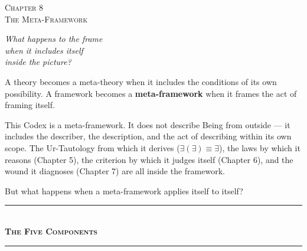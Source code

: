 \documentclass[10pt, openany, oneside]{book}
\renewcommand{\normalsize}{\fontsize{10}{13}\selectfont}
\renewcommand{\large}{\fontsize{11.5}{14}\selectfont}
\renewcommand{\huge}{\fontsize{17}{21}\selectfont}
\begin{document}
%
%
%

\newpage

\begin{center}
    {\huge\scshape Chapter 8}\\[0.3em]
    {\large\scshape The Meta-Framework}
\end{center}

\vspace{1.5em}

\begin{center}
    \itshape
    What happens to the frame\\
    when it includes itself\\
    inside the picture?
\end{center}

\vspace{2em}


\noindent A theory becomes a meta-theory when it includes the conditions of its own possibility. A framework becomes a \textbf{meta-framework} when it frames the act of framing itself.

This Codex is a meta-framework. It does not describe Being from outside --- it includes the describer, the description, and the act of describing within its own scope. The Ur-Tautology from which it derives ($\exists(\exists) \equiv \exists$), the laws by which it reasons (Chapter 5), the criterion by which it judges itself (Chapter 6), and the wound it diagnoses (Chapter 7) are all inside the framework.

But what happens when a meta-framework applies itself to itself?

\vspace{1.5em}


\begin{center}
    \rule{0.3\textwidth}{0.4pt}\\[0.5em]
    {\normalsize\bfseries\scshape The Five Components}\\[0.3em]
    \rule{0.3\textwidth}{0.4pt}
\end{center}
\end{document}
